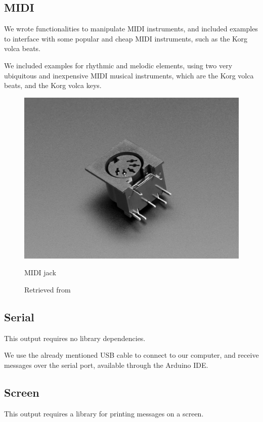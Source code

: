 \subsection{MIDI}

We wrote functionalities to manipulate MIDI instruments, and included examples to interface with some popular and cheap MIDI instruments, such as the Korg volca beats.

We included examples for rhythmic and melodic elements, using two very ubiquitous and inexpensive MIDI musical instruments, which are the Korg volca beats, and the Korg volca keys.

\begin{figure}[ht]
  \centering
  \includegraphics[width=0.75\linewidth,height=0.25\textheight,keepaspectratio]{images/materials-adafruit-midi-jack.jpg}
  \caption{MIDI jack}
  \caption*{Retrieved from \cite{website-materials-adafruit-midi-jack}}
  \label{fig:materials-adafruit-midi-jack}
\end{figure}

\subsection{Serial}

This output requires no library dependencies.

We use the already mentioned USB cable to connect to our computer, and receive messages over the serial port, available through the Arduino IDE.

\subsection{Screen}

This output requires a library for printing messages on a screen.

